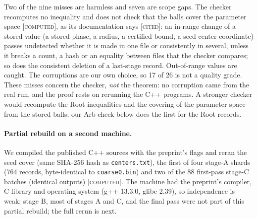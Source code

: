 \documentclass[11pt]{article}
\newcommand{\st}[1]{\textsc{[#1]}}
\newcommand{\stcomp}{\st{computed}}
\newcommand{\stcited}{\st{cited}}
\theoremstyle{definition}
\theoremstyle{remark}
\begin{document}
\noindent Two of the nine misses are harmless and seven are scope gaps. The checker recomputes
no inequality and does not check that the balls cover the parameter space \stcomp, as its documentation says \cite{OAI}
\stcited: an in-range change of a stored value (a stored phase, a radius, a certified bound, a seed-center coordinate)
passes undetected whether it is made in one file or consistently in several, unless it breaks a count, a hash or
an equality between files that the checker compares; so does the consistent deletion of a last-stage record.
Out-of-range values are caught. The corruptions are our own choice, so 17 of
26 is not a quality grade. These misses concern the checker, \emph{not} the theorem: no corruption came from the real run,
and the proof rests on rerunning the C++ programs. A stronger checker would recompute the Root inequalities and the
covering of the parameter space from the stored balls; our Arb check below does the first for the Root records.

\paragraph{Partial rebuild on a second machine.} We compiled the published C++ sources with the preprint's
flags and reran the seed cover (same SHA-256 hash as \texttt{centers.txt}), the first of four stage-A
shards (764 records, byte-identical to \texttt{coarse0.bin}) and two of the 88 first-pass stage-C batches (identical
outputs) \stcomp. The machine had the preprint's compiler, C library and operating system (g++ 13.3.0, glibc 2.39), so
independence is weak; stage B, most of stages A and C, and the final pass were not part of this partial rebuild; the full rerun is next.
\end{document}
